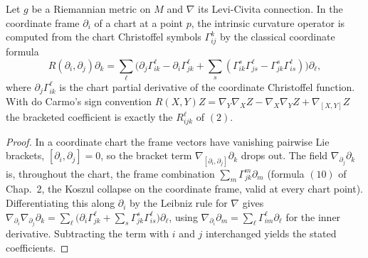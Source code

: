\begin{lemma}
  \label{lem:dc-ch8-3-chart-curvature}
  \leanok
  Let $g$ be a Riemannian metric on $M$ and $\nabla$ its Levi-Civita connection.
  In the coordinate frame $\partial_i$ of a chart at a point $p$, the intrinsic
  curvature operator is computed from the chart Christoffel symbols
  $\Gamma^k_{ij}$ by the classical coordinate formula
  $$
  R(\partial_i,\partial_j)\partial_k
    = \sum_\ell\Big(\partial_j\Gamma^\ell_{ik}-\partial_i\Gamma^\ell_{jk}
      +\sum_s(\Gamma^s_{ik}\Gamma^\ell_{js}-\Gamma^s_{jk}\Gamma^\ell_{is})\Big)\partial_\ell,
  $$
  where $\partial_j\Gamma^\ell_{ik}$ is the chart partial derivative of the
  coordinate Christoffel function. With do Carmo's sign convention
  $R(X,Y)Z=\nabla_Y\nabla_X Z-\nabla_X\nabla_Y Z+\nabla_{[X,Y]}Z$ the bracketed
  coefficient is exactly the $R^\ell_{ijk}$ of $(2)$.
\end{lemma}
\begin{proof}
  \leanok
  In a coordinate chart the frame vectors have vanishing pairwise Lie brackets,
  $[\partial_i,\partial_j]=0$, so the bracket term
  $\nabla_{[\partial_i,\partial_j]}\partial_k$ drops out. The field
  $\nabla_{\partial_j}\partial_k$ is, throughout the chart, the frame combination
  $\sum_m\Gamma^m_{jk}\partial_m$ (formula $(10)$ of Chap.~2, the Koszul collapse
  on the coordinate frame, valid at every chart point). Differentiating this
  along $\partial_i$ by the Leibniz rule for $\nabla$ gives
  $\nabla_{\partial_i}\nabla_{\partial_j}\partial_k
   =\sum_\ell\big(\partial_i\Gamma^\ell_{jk}
   +\sum_s\Gamma^s_{jk}\Gamma^\ell_{is}\big)\partial_\ell$, using
  $\nabla_{\partial_i}\partial_m=\sum_\ell\Gamma^\ell_{im}\partial_\ell$ for the
  inner derivative. Subtracting the term with $i$ and $j$ interchanged yields the
  stated coefficients.
\end{proof}

